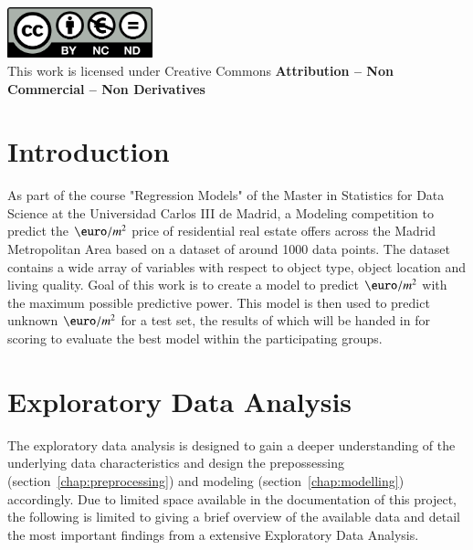 \documentclass[11pt]{report} %
\begin{document}
\begin{titlepage}
\begin{sffamily}
	\noindent\includegraphics[width=4.2cm]{Images/creativecommons.png}\\ %
    \footnotesize{This work is licensed under Creative Commons \textbf{Attribution – Non Commercial – Non Derivatives}}
	
	\end{sffamily}
\end{titlepage}


\tableofcontents
\thispagestyle{fancy}


\clearpage
{} %

\chapter{Introduction}

As part of the course "Regression Models" of the Master in Statistics for Data Science at the Universidad Carlos III de Madrid, a Modeling competition to predict the $\text{\euro}/m^2$ price of residential real estate offers across the Madrid Metropolitan Area based on a dataset of around 1000 data points. The dataset contains a wide array of variables with respect to object type, object location and living quality. Goal of this work is to create a model to predict $\text{\euro}/m^2$ with the maximum possible predictive power. This model is then used to predict unknown $\text{\euro}/m^2$ for a test set, the results of which will be handed in for scoring to evaluate the best model within the participating groups.

\chapter{Exploratory Data Analysis}\label{chap:EDA}

The exploratory data analysis is designed to gain a deeper understanding of the underlying data characteristics and design the prepossessing (section~\ref{chap:preprocessing}) and modeling (section~\ref{chap:modelling}) accordingly. Due to limited space available in the documentation of this project, the following is limited to giving a brief overview of the available data and detail the most important findings from a extensive Exploratory Data Analysis. 
\end{document}
